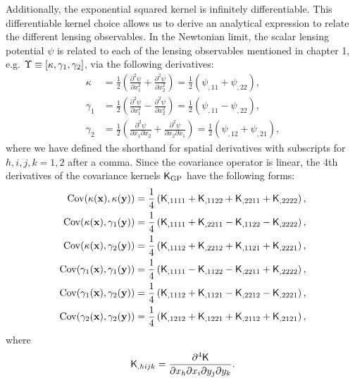 Additionally, the exponential squared kernel is infinitely differentiable. This
differentiable kernel choice allows us to derive an analytical expression to
relate the different lensing observables.  
In the Newtonian limit, the scalar lensing potential $\psi$ is related to 
each of the lensing observables mentioned in chapter 1, e.g. 
$\Upsilon \equiv [\kappa, \gamma_1, \gamma_2]$, via the following derivatives:
\begin{align}
\kappa &= \frac{1}{2}\left(\frac{\partial^2 \psi}{\partial x_1^2} +
\frac{\partial^2 \psi}{\partial x_2^2 }\right) 
= \frac{1}{2} (\psi_{,11} + \psi_{,22}),\\ 
\gamma_1 
&=\frac{1}{2}\left(\frac{\partial^2 \psi}{\partial x_1^2} - 
\frac{\partial^2 \psi}{\partial x_2^2}\right) 
= \frac{1}{2} (\psi_{,11} - \psi_{,22}), \\
\gamma_2 
&=\frac{1}{2}\left(\frac{\partial^2 \psi}{\partial x_1 \partial
x_2} + \frac{\partial^2 \psi}{\partial x_2 \partial x_1}\right)
= \frac{1}{2} (\psi_{,12} + \psi_{,21}), 
\end{align}
where we have defined the shorthand for spatial derivatives with
subscripts for $h,i,j,k = 1, 2$ after a comma.
Since the covariance operator is linear, the 4th derivatives of the covariance
kernels $\mathsf{K}_{\rm GP}$ have the following forms: 
\begin{align}
	\label{eq:kernel_derivatives1}
	\mathrm{Cov} (\kappa(\mathbf{x}), \kappa(\mathbf{y}))
&= \frac{1}{4}\left(
\mathsf{K}_{,1111} + \mathsf{K}_{,1122} + \mathsf{K}_{,2211} + \mathsf{K}_{,2222}
\right), \\
\mathrm{Cov}(\kappa(\mathbf{x}), \gamma_1(\mathbf{y})) &= \frac{1}{4}\left(
\mathsf{K}_{,1111} + \mathsf{K}_{,2211} - \mathsf{K}_{,1122} - \mathsf{K}_{,2222}
\right), \\
\mathrm{Cov}(\kappa(\mathbf{x}), \gamma_2(\mathbf{y})) &= \frac{1}{4}\left(
\mathsf{K}_{,1112} + \mathsf{K}_{,2212} + \mathsf{K}_{,1121} + \mathsf{K}_{,2221}
\right),\\
\mathrm{Cov}(\gamma_1(\mathbf{x}), \gamma_1(\mathbf{y})) &= \frac{1}{4}\left(
\mathsf{K}_{,1111} - \mathsf{K}_{,1122} - \mathsf{K}_{,2211} + \mathsf{K}_{,2222}
\right), \\
\mathrm{Cov}(\gamma_1(\mathbf{x}), \gamma_2(\mathbf{y})) &= \frac{1}{4}\left(
\mathsf{K}_{,1112} + \mathsf{K}_{,1121} - \mathsf{K}_{,2212} - \mathsf{K}_{,2221}
\right), \\
\mathrm{Cov}(\gamma_2(\mathbf{x}), \gamma_2(\mathbf{y})) &= \frac{1}{4}\left(
\mathsf{K}_{,1212} + \mathsf{K}_{,1221} + \mathsf{K}_{,2112} + \mathsf{K}_{,2121}
\right),
	\label{eq:kernel_derivatives2}
\end{align}
where
\begin{equation}
	\mathsf{K}_{,hijk} = \frac{\partial^4 \mathsf{K}}{\partial x_h \partial x_i
	\partial y_j \partial y_k}.
\end{equation}

